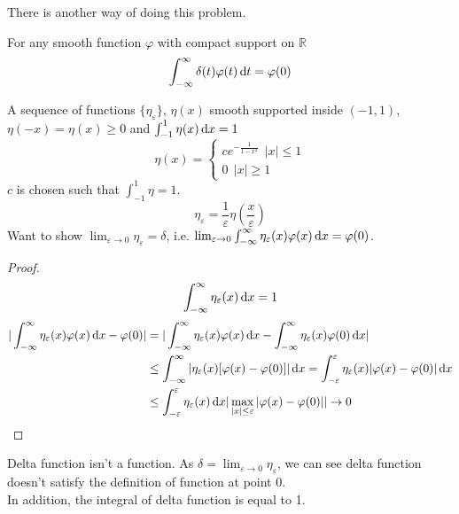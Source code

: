 There is another way of doing this problem.
\begin{definition} For any smooth function $\varphi$ with compact support on $\mathbb{R}$
\[\int_{-\infty}^\infty \delta(t)\varphi(t)\,\mathrm{d} t=\varphi(0)
\]\end{definition}
\begin{example}
A sequence of functions $\{\eta_\varepsilon\}$, $\eta(x)$ smooth supported inside $(-1,1)$, $\eta(-x)=\eta(x)\geq0$ and $\int_{-1}^1\eta(x)\,\mathrm{d} x=1$\\
\[\eta(x)=\begin{cases}ce^{-\frac{1}{1-x^2}}~~|x|\leq1\\0~~|x|\geq1\end{cases}
\]
$c$ is chosen such that $\int_{-1}^1\eta=1$.
\[\eta_\varepsilon=\frac{1}{\varepsilon}\eta(\frac{x}{\varepsilon})
\]
 Want to show $\lim_{\varepsilon\rightarrow0}\eta_\varepsilon=\delta$, i.e. $\lim_{\varepsilon\rightarrow0}\int_{-\infty}^\infty\eta_\varepsilon(x)\varphi(x)\,\mathrm{d} x=\varphi(0)$.
\end{example}
\begin{proof}
\[\int_{-\infty}^\infty\eta_\varepsilon(x)\,\mathrm{d} x=1
\]
\[\begin{aligned}
|\int_{-\infty}^\infty\eta_\varepsilon(x)\varphi(x)\,\mathrm{d} x-\varphi(0)|&=|\int_{-\infty}^\infty\eta_\varepsilon(x)\varphi(x)\,\mathrm{d} x-\int_{-\infty}^\infty\eta_\varepsilon(x)\varphi(0)\,\mathrm{d} x|\\
&\leq\int_{-\infty}^\infty|\eta_\varepsilon(x)[\varphi(x)-\varphi(0)]|\,\mathrm{d} x=\int_{-\varepsilon}^\varepsilon\eta_\varepsilon(x)|\varphi(x)-\varphi(0)|\,\mathrm{d} x\\
&\leq\int_{-\varepsilon}^\varepsilon\eta_{\varepsilon}(x)\,\mathrm{d} x|\max_{|x|\leq\varepsilon}|\varphi(x)-\varphi(0)||\rightarrow0
\end{aligned}
\]




\end{proof}
\begin{remark}
Delta function isn't a function. As $\delta=\lim_{\varepsilon\rightarrow0}\eta_\varepsilon$, we can see delta function doesn't satisfy the definition of function at point 0. \\
In addition, the integral of delta function is equal to 1.

\end{remark}
